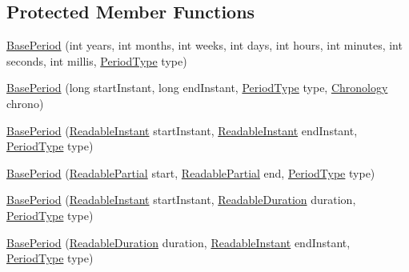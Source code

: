 \subsection*{Protected Member Functions}
\begin{DoxyCompactItemize}
\item 
\hyperlink{classorg_1_1joda_1_1time_1_1base_1_1_base_period_a529f8a14dfcafca8491d3f63bc2a4d5e}{Base\-Period} (int years, int months, int weeks, int days, int hours, int minutes, int seconds, int millis, \hyperlink{classorg_1_1joda_1_1time_1_1_period_type}{Period\-Type} type)
\item 
\hyperlink{classorg_1_1joda_1_1time_1_1base_1_1_base_period_a95e828b04639632747fecd698919222e}{Base\-Period} (long start\-Instant, long end\-Instant, \hyperlink{classorg_1_1joda_1_1time_1_1_period_type}{Period\-Type} type, \hyperlink{classorg_1_1joda_1_1time_1_1_chronology}{Chronology} chrono)
\item 
\hyperlink{classorg_1_1joda_1_1time_1_1base_1_1_base_period_a750238959ff70f5c01fc3edad0a9dbe8}{Base\-Period} (\hyperlink{interfaceorg_1_1joda_1_1time_1_1_readable_instant}{Readable\-Instant} start\-Instant, \hyperlink{interfaceorg_1_1joda_1_1time_1_1_readable_instant}{Readable\-Instant} end\-Instant, \hyperlink{classorg_1_1joda_1_1time_1_1_period_type}{Period\-Type} type)
\item 
\hyperlink{classorg_1_1joda_1_1time_1_1base_1_1_base_period_aa07fbfbed5d0b9a93016fbf841dc19df}{Base\-Period} (\hyperlink{interfaceorg_1_1joda_1_1time_1_1_readable_partial}{Readable\-Partial} start, \hyperlink{interfaceorg_1_1joda_1_1time_1_1_readable_partial}{Readable\-Partial} end, \hyperlink{classorg_1_1joda_1_1time_1_1_period_type}{Period\-Type} type)
\item 
\hyperlink{classorg_1_1joda_1_1time_1_1base_1_1_base_period_a408f18c99b6cd3c89f1e5d05be2b4e1f}{Base\-Period} (\hyperlink{interfaceorg_1_1joda_1_1time_1_1_readable_instant}{Readable\-Instant} start\-Instant, \hyperlink{interfaceorg_1_1joda_1_1time_1_1_readable_duration}{Readable\-Duration} duration, \hyperlink{classorg_1_1joda_1_1time_1_1_period_type}{Period\-Type} type)
\item 
\hyperlink{classorg_1_1joda_1_1time_1_1base_1_1_base_period_a37e39548db9e067143972d34c4969e96}{Base\-Period} (\hyperlink{interfaceorg_1_1joda_1_1time_1_1_readable_duration}{Readable\-Duration} duration, \hyperlink{interfaceorg_1_1joda_1_1time_1_1_readable_instant}{Readable\-Instant} end\-Instant, \hyperlink{classorg_1_1joda_1_1time_1_1_period_type}{Period\-Type} type)
\item 

\end{DoxyCompactItemize}
